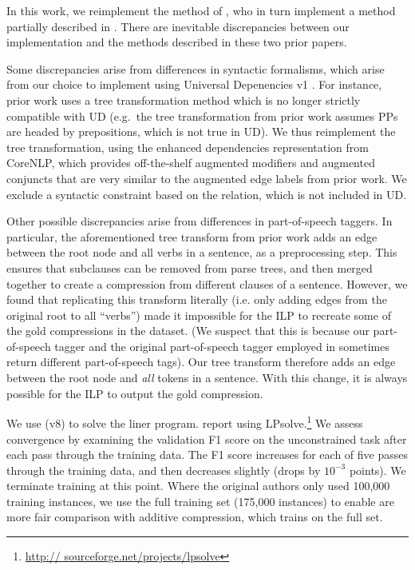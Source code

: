 In this work, we reimplement the method of \citet{filippova2013overcoming}, who in turn implement a method partially described in \citet{filippova2008dependency}.  There are inevitable discrepancies between our implementation and the methods described in these two prior papers.  

Some discrepancies arise from differences in syntactic formalisms, which arise from our choice to implement using Universal Depenencies v1 \cite{Nivre2016UniversalDV}. For instance, prior work uses a tree transformation method which is no longer strictly compatible with UD (e.g.~the tree transformation from prior work assumes PPs are headed by prepositions, which is not true \cite{Schuster2016EnhancedEU} in UD). We thus reimplement the tree transformation, using the enhanced dependencies representation from CoreNLP, which provides off-the-shelf augmented modifiers and augmented conjuncts that are very similar to the augmented edge labels from prior work. We exclude a syntactic constraint based on the  relation, which is not included in UD.

Other possible discrepancies arise from differences in part-of-speech taggers. In particular, the aforementioned tree transform from prior work adds an edge between the root node and all verbs in a sentence, as a preprocessing step. This ensures that subclauses can be removed from parse trees, and then merged together to create a compression from different clauses of a sentence. However, we found that replicating this transform literally (i.e. only adding edges from the original root to all ``verbs'') made it impossible for the ILP to recreate some of the gold compressions in the dataset. (We suspect that this is because our part-of-speech tagger and the original part-of-speech tagger employed in \citet{filippova2013overcoming} sometimes return different part-of-speech tags). Our tree transform therefore adds an edge between the root node and \textit{all} tokens in a sentence. With this change, it is always possible for the ILP to output the gold compression.

We use \citet{gurobi} (v8) to solve the liner program. \citet{filippova2008dependency} report using LPsolve.\footnote{\url{http://
sourceforge.net/projects/lpsolve}}  We assess convergence by examining the validation F1 score on the unconstrained task after each pass through the training data. The F1 score increases for each of five passes through the training data, and then decreases slightly (drops by $10^{-3}$ points). We terminate training at this point. Where the original authors only used 100,000 training instances, we use the full training set (175,000 instances) to enable are more fair comparison with additive compression, which trains on the full set.

